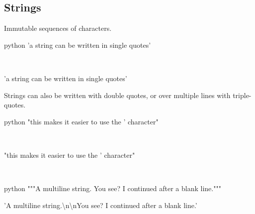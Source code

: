 \documentclass[aspectratio=1610,slidestop]{beamer}
\begin{document}
\subsection{Strings}
\begin{pframe}
Immutable sequences of characters.
 \begin{ipython}
  \begin{pythonin}{python}
'a string can be written in single quotes'
  \end{pythonin}
  \\
  \begin{pythonout}
'a string can be written in single quotes'
  \end{pythonout}
 \end{ipython}

Strings can also be written with double quotes, or over multiple lines with
triple-quotes.
 \begin{ipython}
  \begin{pythonin}{python}
"this makes it easier to use the ' character"
  \end{pythonin}
  \\
  \begin{pythonout}
"this makes it easier to use the ' character"
  \end{pythonout}
  \\

  \begin{pythonin}{python}
"""A multiline string.
You see? I continued after a blank line."""
  \end{pythonin}
  \begin{pythonout}
'A multiline string.\textbackslash n\textbackslash nYou see? I continued after a blank line.'
  \end{pythonout}
 \end{ipython}
\end{pframe}
\end{document}
